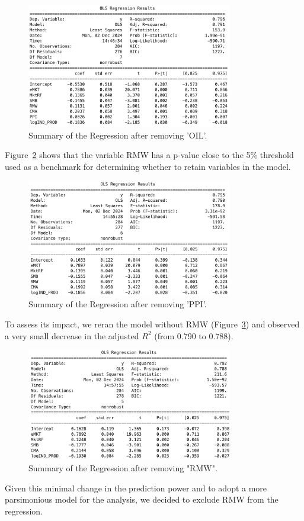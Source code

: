\documentclass[12pt, openright, oneside]{report}
\begin{document}
\begin{figure}[h]
    \centering
    \includegraphics[width=0.8\textwidth]{images/OIL3.png}
    \caption{Summary of the Regression after removing 'OIL'.}\label{fig:OIL3}
\end{figure}
Figure~\ref{fig:PPI4} shows that the variable RMW has a p-value close to the 5\% threshold used as a benchmark for
determining whether to retain variables in the model. 

 \begin{figure}[h]
    \centering
    \includegraphics[width=0.8\textwidth]{images/PPI4.png}
    \caption{Summary of the Regression after removing 'PPI'.}\label{fig:PPI4}
\end{figure}

To assess its impact, we reran the model without RMW (Figure~\ref{fig:RMW5}) and observed a very small decrease in the 
adjusted $R^2$ (from 0.790 to 0.788).

\begin{figure}[h!]
    \centering
    \includegraphics[width=0.8\textwidth]{images/RMW5.png}
    \caption{Summary of the Regression after removing "RMW".}\label{fig:RMW5}
\end{figure}

Given this minimal change in the prediction power and to adopt a more parsimonious model for the analysis, we decided to
exclude RMW from the regression.

\end{document}
